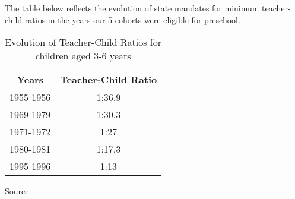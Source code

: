 
The table below reflects the evolution of state mandates for minimum teacher-child ratios in the years our 5 cohorts were eligible for preschool. 

\begin{table}
\begin{center}
\caption{Evolution of Teacher-Child Ratios for children aged 3-6 years}
\label{tab:ratios}
\begin{tabular}{c c}
\toprule
Years & \multicolumn{1}{C{7em}}{Teacher-Child Ratio} \\
\midrule
1955-1956 & 1:36.9 \\
1969-1979 & 1:30.3 \\
1971-1972 & 1:27 \\
1980-1981 & 1:17.3 \\
1995-1996 & 1:13 \\
\bottomrule
\end{tabular}
\end{center}
\small
Source: \citet {Hohnerlein_2015_Development-and-Diffusion}
\end{table}

